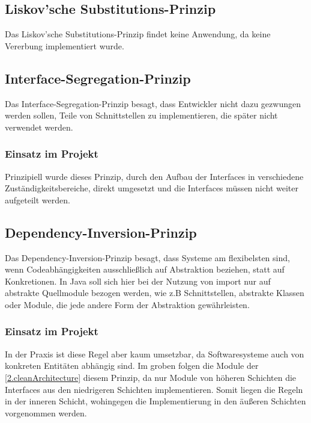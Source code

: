 		\subsection{Liskov’sche Substitutions-Prinzip}
		Das Liskov'sche Substitutions-Prinzip findet keine Anwendung, da keine Vererbung implementiert wurde.
		
		\subsection{Interface-Segregation-Prinzip}
		Das Interface-Segregation-Prinzip besagt, dass Entwickler nicht dazu gezwungen werden sollen, Teile von Schnittstellen zu implementieren, die später nicht verwendet werden. 
			\subsubsection{Einsatz im Projekt}
			Prinzipiell wurde dieses Prinzip, durch den Aufbau der Interfaces in verschiedene Zuständigkeitsbereiche, direkt umgesetzt und die Interfaces müssen nicht weiter aufgeteilt werden.
		
		\subsection{Dependency-Inversion-Prinzip}
		Das Dependency-Inversion-Prinzip besagt, dass Systeme am flexibelsten sind, wenn Codeabhängigkeiten ausschließlich auf Abstraktion beziehen, statt auf Konkretionen. In Java soll sich hier bei der Nutzung von import nur auf abstrakte Quellmodule bezogen werden, wie z.B Schnittstellen, abstrakte Klassen oder Module, die jede andere Form der Abstraktion gewährleisten.
			\subsubsection{Einsatz im Projekt}
			In der Praxis ist diese Regel aber kaum umsetzbar, da Softwaresysteme auch von konkreten Entitäten abhängig sind. Im groben folgen die Module der \cref{2.cleanArchitecture} diesem Prinzip, da nur Module von höheren Schichten die Interfaces aus den niedrigeren Schichten implementieren. Somit liegen die Regeln in der inneren Schicht, wohingegen die Implementierung in den äußeren Schichten vorgenommen werden.

